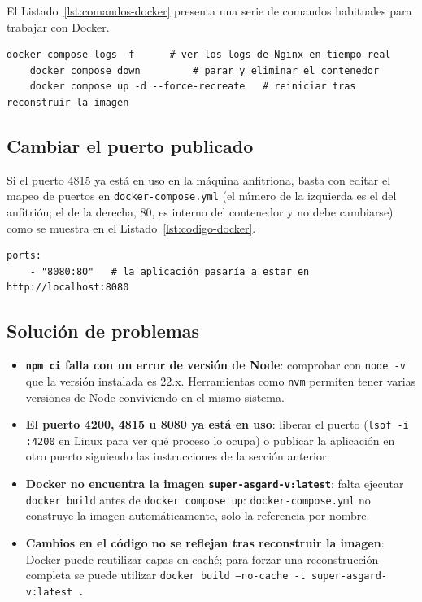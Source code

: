 \documentclass[../main.tex]{subfiles}
\begin{document}
El Listado~\ref{lst:comandos-docker} presenta una serie de comandos habituales para trabajar con Docker.

\begin{lstlisting}[caption={Comandos para realizar operaciones habituales con Docker.},label={lst:comandos-docker}]
	docker compose logs -f      # ver los logs de Nginx en tiempo real
	docker compose down         # parar y eliminar el contenedor
	docker compose up -d --force-recreate   # reiniciar tras reconstruir la imagen
\end{lstlisting}

\subsection{Cambiar el puerto publicado}

Si el puerto 4815 ya está en uso en la máquina anfitriona, basta con editar el mapeo de puertos en \texttt{docker-compose.yml} (el número de la izquierda es el del anfitrión; el de la derecha, 80, es interno del contenedor y no debe cambiarse) como se muestra en el Listado~\ref{lst:codigo-docker}.

\begin{lstlisting}[caption={Código modificado con otro puerto.},label={lst:codigo-docker}]
	ports:
	- "8080:80"   # la aplicación pasaría a estar en http://localhost:8080
\end{lstlisting}

\subsection{Solución de problemas}

\begin{itemize}
	\item \textbf{\texttt{npm ci} falla con un error de versión de Node}: comprobar con \texttt{node -v} que la versión instalada es 22.x. Herramientas como \texttt{nvm} permiten tener varias versiones de Node conviviendo en el mismo sistema.
	\item \textbf{El puerto 4200, 4815 u 8080 ya está en uso}: liberar el puerto (\texttt{lsof -i :4200} en Linux para ver qué proceso lo ocupa) o publicar la aplicación en otro puerto siguiendo las instrucciones de la sección anterior.
	\item \textbf{Docker no encuentra la imagen \texttt{super-asgard-v:latest}}: falta ejecutar \texttt{docker build} antes de \texttt{docker compose up}: \texttt{docker-compose.yml} no construye la imagen automáticamente, solo la referencia por nombre.
	\item \textbf{Cambios en el código no se reflejan tras reconstruir la imagen}: Docker puede reutilizar capas en caché; para forzar una reconstrucción completa se puede utilizar \texttt{docker build --no-cache -t super-asgard-v:latest .}
\end{itemize}
	
\end{document}
